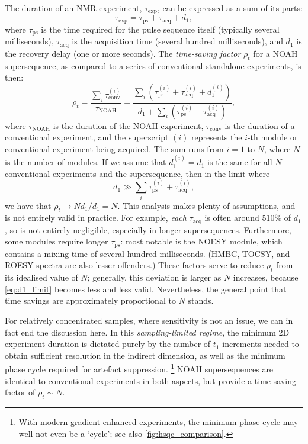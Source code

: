 The duration of an NMR experiment, $\tau_\text{exp}$, can be expressed as a sum of its parts:
\begin{equation}
    \label{eq:exp_duration_2d}
    \tau_\text{exp} = \tau_\text{ps} + \tau_\text{acq} + d_1,
\end{equation}
where $\tau_\text{ps}$ is the time required for the pulse sequence itself (typically several milliseconds), $\tau_\text{acq}$ is the acquisition time (several hundred milliseconds), and $d_1$ is the recovery delay (one or more seconds).
The \textit{time-saving factor} $\rho_t$ for a NOAH supersequence, as compared to a series of conventional standalone experiments, is then:
\begin{equation}
    \label{eq:rho_t}
    \rho_t
    = \frac{\sum_i \tau_\text{conv}^{(i)}}{\tau_\text{NOAH}}
    = \frac{{\sum_i (\tau_\text{ps}^{(i)} + \tau_\text{acq}^{(i)} + d_1^{(i)})}}{d_1 + \sum_i (\tau_\text{ps}^{(i)} + \tau_\text{acq}^{(i)})},
\end{equation}
where $\tau_\text{NOAH}$ is the duration of the NOAH experiment, $\tau_\text{conv}$ is the duration of a conventional experiment, and the superscript $(i)$ represents the $i$-th module or conventional experiment being acquired.
The sum runs from $i = 1$ to $N$, where $N$ is the number of modules.
If we assume that $d_1^{(i)} = d_1$ is the same for all $N$ conventional experiments and the supersequence, then in the limit where
\begin{equation}
    \label{eq:d1_limit}
    d_1 \gg \sum_i \tau_\text{ps}^{(i)} + \tau_\text{acq}^{(i)},
\end{equation}
we have that $\rho_t \to Nd_1/d_1 = N$.
This analysis makes plenty of assumptions, and is not entirely valid in practice.
For example, \textit{each} $\tau_\text{acq}$ is often around 5\text{--}10\% of $d_1$, so is not entirely negligible, especially in longer supersequences.
Furthermore, some modules require longer $\tau_\text{ps}$: most notable is the NOESY module, which contains a mixing time of several hundred milliseconds. (HMBC, TOCSY, and ROESY spectra are also lesser offenders.)
These factors serve to reduce $\rho_t$ from its idealised value of $N$; generally, this deviation is larger as $N$ increases, because \cref{eq:d1_limit} becomes less and less valid.
Nevertheless, the general point that time savings are approximately proportional to $N$ stands.

For relatively concentrated samples, where sensitivity is not an issue, we can in fact end the discussion here.
In this \textit{sampling-limited regime}, the minimum 2D experiment duration is dictated purely by the number of $t_1$ increments needed to obtain sufficient resolution in the indirect dimension, as well as the minimum phase cycle required for artefact suppression.%
\footnote{With modern gradient-enhanced experiments, the minimum phase cycle may well not even be a `cycle'; see also \cref{fig:hsqc_comparison}.}
NOAH supersequences are identical to conventional experiments in both aspects, but provide a time-saving factor of $\rho_t \sim N$.

